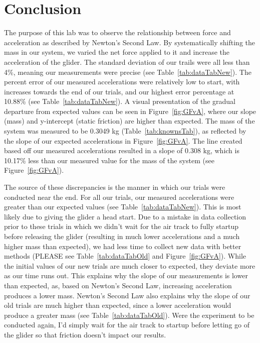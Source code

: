 
\section{Conclusion}

\vspace{-0.5cm}
\singlespacing
The purpose of this lab was to observe the relationship between force and acceleration as described by Newton's Second Law. By systematically shifting the mass in our system, we varied the net force applied to it and increase the acceleration of the glider. The standard deviation of our trails were all less than 4\%, meaning our measurements were precise (see Table~\ref{tab:dataTabNew}). The percent error of our measured accelerations were relatively low to start, with increases towards the end of our trials, and our highest error percentage at 10.88\% (see Table~\ref{tab:dataTabNew}). A visual presentation of the gradual departure from expected values can be seen in Figure~\ref{fig:GFvA}, where our slope (mass) and y-intercept (static friction) are higher than expected. The mass of the system was measured to be 0.3049 kg (Table~\ref{tab:knownsTab}), as reflected by the slope of our expected accelerations in Figure~\ref{fig:GFvA}. The line created based off our measured accelerations resulted in a slope of 0.308 kg, which is 10.17\% less than our measured value for the mass of the system (see Figure~\ref{fig:GFvA}).\par 
 The source of these discrepancies is the manner in which our trials were conducted near the end. For all our trials, our measured accelerations were greater than our expected values (see Table~\ref{tab:dataTabNew}). This is most likely due to giving the glider a head start. Due to a mistake in data collection prior to these trials in which we didn't wait for the air track to fully startup before releasing the glider (resulting in much lower accelerations and a much higher mass than expected), we had less time to collect new data with better methods (PLEASE see Table~\ref{tab:dataTabOld} and Figure~\ref{fig:GFvA}). While the initial values of our new trials are much closer to expected, they deviate more as our time runs out. This explains why the slope of our measurements is lower than expected, as, based on Newton's Second Law, increasing acceleration produces a lower mass. Newton's Second Law also explains why the slope of our old trials are much higher than expected, since a lower acceleration would produce a greater mass (see Table~\ref{tab:dataTabOld}). Were the experiment to be conducted again, I'd simply wait for the air track to startup before letting go of the glider so that friction doesn't impact our results. 
